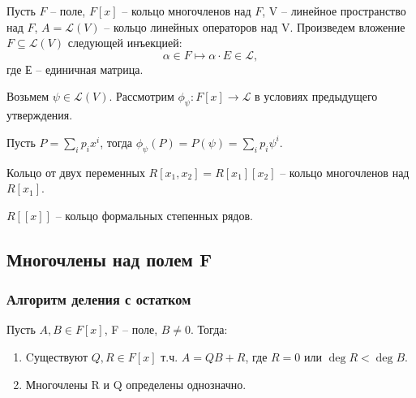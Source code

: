 \begin{algorithm}
    Пусть $F$ -- поле, $F[x]$ -- кольцо многочленов над $F$, V -- линейное пространство над $F$, 
    $A = \mathcal{L}(V)$ -- кольцо линейных операторов над V. Произведем вложение 
    $F \subseteq \mathcal{L}(V)$ следующей инъекцией: 
    $$\alpha \in F \mapsto \alpha \cdot E \in \mathcal{L},$$ где Е -- единичная матрица.
    
    Возьмем $\psi \in \mathcal{L}(V)$. Рассмотрим $\phi_\psi: F[x] \to \mathcal{L}$ в условиях 
    предыдущего утверждения. 
    
    Пусть $P = \displaystyle\sum_{i}p_i x^i$, 
    тогда $\phi_\psi(P) = P(\psi) = \displaystyle\sum_{i} p_i \psi^i$.
\end{algorithm}

\begin{note}
    Кольцо от двух переменных $R[x_1, x_2] = R[x_1][x_2]$ -- кольцо многочленов над $R[x_1]$.
\end{note}

\begin{note}
    $R[[x]]$ -- кольцо формальных степенных рядов.
\end{note}

\subsection{Многочлены над полем F}
\subsubsection{Алгоритм деления с остатком}

\begin{theorem}
    Пусть $A, B \in F[x]$, F -- поле, $B \neq 0$. Тогда:
    \begin{enumerate}
        \item Cуществуют $Q, R \in F[x]$ т.ч. $A = QB + R$, где $R = 0$ или $\deg R < \deg B$.
        \item Многочлены R и Q определены однозначно.
    \end{enumerate}
\end{theorem}

